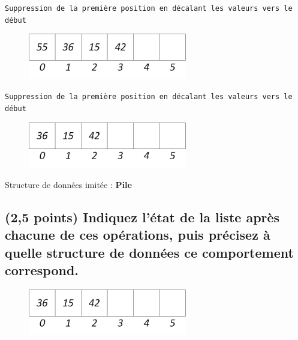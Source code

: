 \documentclass[11pt,a4paper]{article}
\begin{document}
\begin{center}
\texttt{Suppression de la première position en décalant les valeurs vers le début}

\begin{figure}[ht!]
\centering
\centerline{  %
\includegraphics[height=2cm]{img/p-1-Liste_t_4.png}
}
\end{figure}


\texttt{Suppression de la première position en décalant les valeurs vers le début}

\begin{figure}[ht!]
\centering
\centerline{  %
\includegraphics[height=2cm]{img/Liste_t_1.png}
}
\end{figure}


\end{center}

Structure de données imitée : \textbf{Pile}



\newpage

\subsection{(2,5 points) Indiquez l'état de la liste après chacune de ces opérations, puis précisez à quelle structure de données ce comportement correspond. }


\begin{figure}[ht!]
\centering
\centerline{  %
\includegraphics[height=2cm]{img/Liste_t_1.png}
}
\end{figure}
\end{document}

